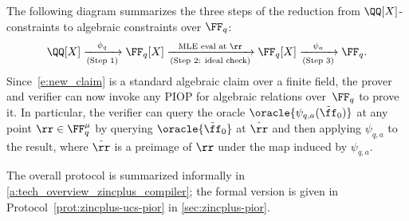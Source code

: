 The following diagram summarizes the three steps of the reduction from $\QQ[X]$-constraints to algebraic constraints over $\FF_q$:
\[
\QQ[X] \xrightarrow[\text{(Step 1)}]{\phi_q} \FF_q[X] \xrightarrow[\text{(Step 2: ideal check)}]{\text{MLE eval at } \rr} \FF_q[X] \xrightarrow[\text{(Step 3)}]{\psi_a} \FF_q.
\]
Since~\eqref{e:new_claim} is a standard algebraic claim over a finite field, the prover and verifier can now invoke any PIOP for algebraic relations over~$\FF_q$ to prove it. In particular, the verifier can query the oracle $\oracle{\psi_{q,a}(\tilde{\ff}_0)}$ at any point $\rr\in \FF_q^\mu$ by querying $\oracle{\tilde{\ff}_0}$  at $\hat{\rr}$ and then applying $\psi_{q,a}$ to the result, where $\hat{\rr}$ is a preimage of $\rr$ under the map induced by $\psi_{q,a}$. 



The overall protocol is summarized informally in \cref{a:tech_overview_zincplus_compiler}; the formal version is given in Protocol~\ref{prot:zincplus-ucs-pior} in \cref{sec:zincplus-pior}.

